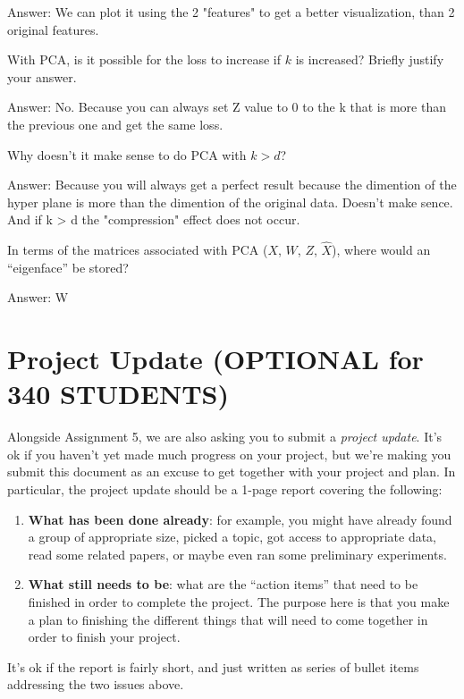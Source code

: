 \documentclass{article}
\def\ans#1{\par\gre{Answer: #1}}
\def\gre#1{{\color{gre}#1}}
\def\enum#1{\begin{enumerate}#1\end{enumerate}}
\begin{document}
{\ans{We can plot it using the 2 "features" to get a better visualization, than 2 original features.}
\item With PCA, is it possible for the loss to increase if $k$ is increased? Briefly justify your answer.
\ans{No. Because you can always set Z value to 0 to the k that is more than the previous one and get the same loss.}
\item Why doesn't it make sense to do PCA with $k > d$?
\ans{Because you will always get a perfect result because the dimention of the hyper plane is more than the dimention of the original data. Doesn't make sence. And if k > d the "compression" effect does not occur. }
\item In terms of the matrices associated with PCA ($X$, $W$, $Z$, $\hat{X}$), where would an ``eigenface'' be stored?
\ans{W}
}
 

\section*{Project Update (OPTIONAL for 340 STUDENTS)}

Alongside Assignment 5, we are also asking you to submit a \emph{project update}. It's ok if you haven't yet made much progress on your project, but we're making you submit this document as an excuse to get together with your project and plan. In particular, the project update should be a 1-page report covering the following:
\enum{
\item \textbf{What has been done already}: for example, you might have already found a group of appropriate size, picked a topic, got access to appropriate data, read some related papers, or maybe even ran some preliminary experiments.
\item \textbf{What still needs to be}: what are the ``action items'' that need to be finished in order to complete the project. The purpose here is that you make a plan to finishing the different things that will need to come together in order to finish your project.
}
It's ok if the report is fairly short, and just written as series of bullet items addressing the two issues above.
\end{document}
